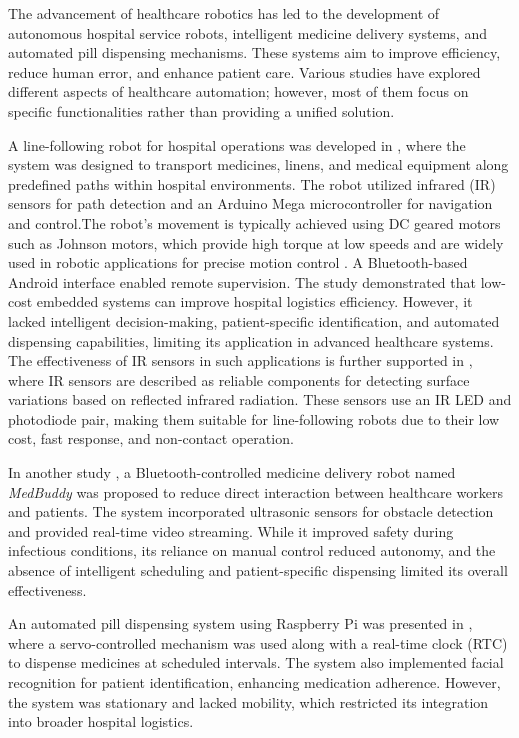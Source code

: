 The advancement of healthcare robotics has led to the development of autonomous hospital service robots, intelligent medicine delivery systems, and automated pill dispensing mechanisms. These systems aim to improve efficiency, reduce human error, and enhance patient care. Various studies have explored different aspects of healthcare automation; however, most of them focus on specific functionalities rather than providing a unified solution.

A line-following robot for hospital operations was developed in \cite{ref1}, where the system was designed to transport medicines, linens, and medical equipment along predefined paths within hospital environments. The robot utilized infrared (IR) sensors for path detection and an Arduino Mega microcontroller for navigation and control.The robot's movement is typically achieved using DC geared motors such as Johnson motors, which provide high torque at low speeds and are widely used in robotic applications for precise motion control \cite{ref8}. A Bluetooth-based Android interface enabled remote supervision. The study demonstrated that low-cost embedded systems can improve hospital logistics efficiency. However, it lacked intelligent decision-making, patient-specific identification, and automated dispensing capabilities, limiting its application in advanced healthcare systems. The effectiveness of IR sensors in such applications is further supported in \cite{ref7}, where IR sensors are described as reliable components for detecting surface variations based on reflected infrared radiation. These sensors use an IR LED and photodiode pair, making them suitable for line-following robots due to their low cost, fast response, and non-contact operation.

In another study \cite{ref2}, a Bluetooth-controlled medicine delivery robot named \textit{MedBuddy} was proposed to reduce direct interaction between healthcare workers and patients. The system incorporated ultrasonic sensors for obstacle detection and provided real-time video streaming. While it improved safety during infectious conditions, its reliance on manual control reduced autonomy, and the absence of intelligent scheduling and patient-specific dispensing limited its overall effectiveness.

An automated pill dispensing system using Raspberry Pi was presented in \cite{ref3}, where a servo-controlled mechanism was used along with a real-time clock (RTC) to dispense medicines at scheduled intervals. The system also implemented facial recognition for patient identification, enhancing medication adherence. However, the system was stationary and lacked mobility, which restricted its integration into broader hospital logistics.

